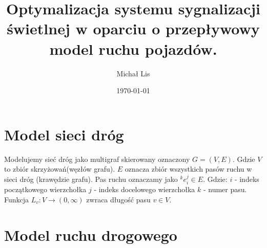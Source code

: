 \documentclass[11pt]{IEEEtran}
\begin{document}
\title{Optymalizacja  systemu sygnalizacji świetlnej w 
oparciu o przepływowy model ruchu pojazdów.}
\author{Michał Lis}
\date{\today}
\maketitle

\section{Model sieci dróg}
Modelujemy sieć dróg jako multigraf skierowany oznaczony $G=(V,E)$.
Gdzie $V$ to zbiór skrzyżowań(węzłów grafu).
$E$ oznacza zbiór wszystkich pasów ruchu w sieci dróg (krawędzie grafu). Pas ruchu oznaczamy jako $^{k}e^{j}_{i}\in{E}$. Gdzie:
$i$ - indeks początkowego wierzchołka
$j$ - indeks docelowego wierzchołka
$k$ - numer pasu.
 Funkcja $L_{v}:V\to (0,\infty)$ zwraca długość pasu $v\in{V}$.
\section{Model ruchu drogowego}
\end{document}
